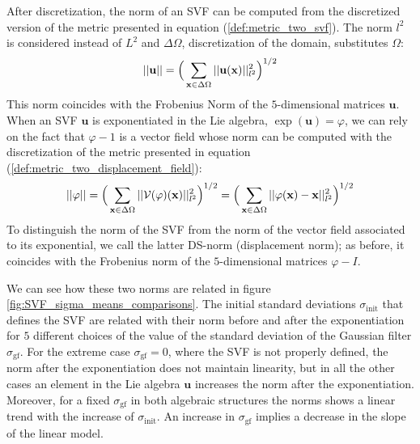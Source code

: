 After discretization, the norm of an SVF can be computed from the discretized version of the metric presented in equation (\ref{def:metric_two_svf}). The norm $l^2$ is considered instead of $L^2$ and $\Delta\Omega$, discretization of the domain, substitutes $\Omega$:
\begin{align*}
\vert\lvert \mathbf{u} \rvert\vert  
= 
\Big( \sum_{\mathbf{x} \in \Delta\Omega} \vert\lvert \mathbf{u}(\mathbf{x})  \rvert\vert_{l^2}^{2}  \Big)^{1/2}
\end{align*} 
This norm coincides with the Frobenius Norm of the $5$-dimensional matrices $\mathbf{u}$.
When an SVF $\mathbf{u}$ is exponentiated in the Lie algebra, $\exp(\mathbf{u}) = \varphi$, we can rely on the fact that $\varphi - 1$ is a vector field whose norm can be computed with the discretization of the metric presented in equation (\ref{def:metric_two_displacement_field}):
\begin{align}\label{eq:ds_norm}
\vert\lvert \varphi \rvert\vert  
= 
\Big( \sum_{\mathbf{x} \in \Delta\Omega} \vert\lvert \mathcal{V}(\varphi)(\mathbf{x})  \rvert\vert_{l^2}^{2}  \Big)^{1/2}
=
\Big( \sum_{\mathbf{x} \in \Delta\Omega} \vert\lvert \varphi(\mathbf{x}) - \mathbf{x}  \rvert\vert_{l^2}^{2}  \Big)^{1/2}
\end{align} 
To distinguish the norm of the SVF from the norm of the vector field associated to its exponential, we call the latter DS-norm (displacement norm); as before, it coincides with the Frobenius norm of the $5$-dimensional matrices $\varphi - I$.

We can see how these two norms are related in figure \ref{fig:SVF_sigma_means_comparisons}. The initial standard deviations $\sigma_{\text{init}}$ that defines the SVF are related with their norm before and after the exponentiation for $5$ different choices of the value of the standard deviation of the Gaussian filter $\sigma_{\text{gf}}$.
For the extreme case $\sigma_{\text{gf}} = 0$, where the SVF is not properly defined, the norm after the exponentiation does not maintain linearity, but in all the other cases an element in the Lie algebra $\mathbf{u}$ increases the norm after the exponentiation. Moreover, for a fixed $\sigma_{\text{gf}} $ in both algebraic structures the norms shows a linear trend with the increase of $\sigma_{\text{init}}$. An increase in $\sigma_{\text{gf}} $ implies a decrease in the slope of the linear model.

